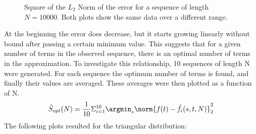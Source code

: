 \begin{figure}[h!]
\begin{center}
\caption{Square of the $L_2$ Norm of the error for a sequence of length $N = 10000$. Both plots show the same data over a different range.}
\end{center}
\end{figure}



At the beginning the error does decrease, but it starts growing linearly without bound after passing a certain minimum value. This suggests that for a given number of terms in the observed sequence, there is an optimal number of terms in the approximation. 
\clearpage
To investigate this relationship, 10 sequences of length N were generated. For each sequence the optimum number of terms is found, and finally their values are averaged. These averages were then plotted as a function of N.
\begin{equation}
    \hat{S}_{opt}(N) = \frac{1}{10}\Sigma_{i=1}^{10} \argmin_s{\norm{f(t) - \hat{f}_i(s,t,N)}^{2}_2}
\end{equation}
The following plots resulted for the triangular distribution:

